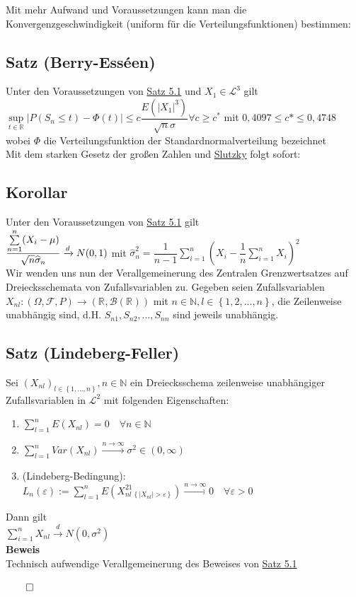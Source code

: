 \documentclass[german,10pt,oneside, fleqn, a4paper]{article}
\newcommand {\R}	{\mathbb{R}}
\newcommand {\N}	{\mathbb{N}}
\newcommand{\ra}{\rightarrow}
\newcommand{\sm}[2][\infty]{\sum\limits_{#2}^{#1}}
\newcommand{\brc}[1]{\left(#1\right)}
\newcommand{\brac}[1]{\left\lbrace #1\right\rbrace}
\newcommand{\QED}{\begin{flushright}$\qed$\end{flushright}}
\newcommand{\mc}[1]{\mathcal{#1}}
\newcommand{\lp}[1]{\mc{L}^{#1}}
\newcommand{\beweis}{\textbf{Beweis}\\}
\newcommand{\toinf}{\rightarrow\infty}
\newcommand{\1}[1]{1_{#1}}
\newcommand{\2}[1]{\1{\brac{#1}}}
\newcommand{\xr}[2][]{\xrightarrow[#1]{#2}}
\newcommand{\rbor}[1][d]{\brc{\R^{#1},\mc{B}\brc{\R^{#1}}}}
\newcommand{\raum}{\brc{\Omega,\mc{F},P}}
\newcommand{\fe}{\forall\varepsilon>0}
\newcommand{\nn}{n\in\N}
\begin{document}
Mit mehr Aufwand und Voraussetzungen kann man die Konvergenzgeschwindigkeit (uniform für die  Verteilungsfunktionen) bestimmen:

\subsection{Satz (Berry-Esséen)}
\label{5.2}
Unter den Voraussetzungen von \hyperref[5.1]{Satz 5.1} und $X_1\in\lp{3}$ gilt\\
$\sup\limits_{t\in\R}|P(S_n\leq t)-\Phi(t)|\leq c\dfrac{E(|X_1|^3)}{\sqrt{n}\sigma}\forall c\geq c^*$ mit $0,4097\leq c*\leq 0,4748$ wobei $\Phi$ die Verteilungsfunktion der Standardnormalverteilung bezeichnet\\
Mit dem starken Gesetz der großen Zahlen und \hyperref[3.12]{Slutzky} folgt sofort:

\subsection{Korollar}
\label{5.3}
Unter den Voraussetzungen von \hyperref[5.1]{Satz 5.1} gilt\\
$\dfrac{\sm[n]{n=1}(X_i-\mu)}{\sqrt{n}\widehat{\sigma}_n}\xr{d}N(0,1)\\ $
mit $\widehat{\sigma}_n^2=\dfrac{1}{n-1}\sm[n]{i=1}\brc{X_i-\dfrac{1}{n}\sm[n]{i=1}X_i}^2$\\
Wir wenden uns nun der Verallgemeinerung des Zentralen Grenzwertsatzes auf Dreiecksschemata von Zufallsvariablen zu. Gegeben seien Zufallsvariablen $X_{nl}:\raum\ra\rbor[]$ mit $\nn ,l\in\brac{1,2,...,n}$, die Zeilenweise unabhängig sind, d.H. $S_{n1},S_{n2},...,S_{nn}$ sind jeweils unabhängig.

\subsection{Satz (Lindeberg-Feller)}
\label{5.4}
Sei $\brc{X_{nl}}_{l\in\brac{1,...,n}},\nn$ ein Dreiecksschema zeilenweise unabhängiger Zufallsvariablen in $\lp{2}$ mit folgenden Eigenschaften:\begin{enumerate}[label=(\alph*)]
\item $ \sm[n]{l=1}E(X_{nl})=0\quad \forall\nn $
\item $ \sm[n]{l=1}Var(X_{nl})\xr{n\toinf}\sigma^2\in(0,\infty)$
\item (Lindeberg-Bedingung):\\
$L_n(\varepsilon):=\sm[n]{l=1}E\brc{X_{nl}^2\1{\brac{|X_{nl}|>\varepsilon}}}\xr{n\toinf}0\quad \fe $
\end{enumerate}
Dann gilt \\
$\sm[n]{i=1}X_{nl}\xr{d}N(0,\sigma^2)$\\
\beweis
Technisch aufwendige Verallgemeinerung des Beweises von \hyperref[5.1]{Satz 5.1}\QED
\end{document}
